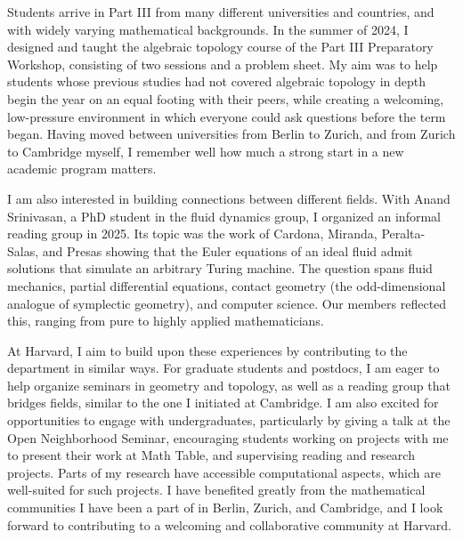 Students arrive in Part III from many different universities and countries, and with widely varying mathematical backgrounds. In the summer of 2024, I designed and taught the algebraic topology course of the Part III Preparatory Workshop, consisting of two sessions and a problem sheet. My aim was to help students whose previous studies had not covered algebraic topology in depth begin the year on an equal footing with their peers, while creating a welcoming, low-pressure environment in which everyone could ask questions before the term began. Having moved between universities from Berlin to Zurich, and from Zurich to Cambridge myself, I remember well how much a strong start in a new academic program matters.

I am also interested in building connections between different fields. With Anand Srinivasan, a PhD student in the fluid dynamics group, I organized an informal reading group in 2025. Its topic was the work of Cardona, Miranda, Peralta-Salas, and Presas showing that the Euler equations of an ideal fluid admit solutions that simulate an arbitrary Turing machine. The question spans fluid mechanics, partial differential equations, contact geometry (the odd-dimensional analogue of symplectic geometry), and computer science. Our members reflected this, ranging from pure to highly applied mathematicians.

At Harvard, I aim to build upon these experiences by contributing to the department in similar ways. For graduate students and postdocs, I am eager to help organize seminars in geometry and topology, as well as a reading group that bridges fields, similar to the one I initiated at Cambridge. I am also excited for opportunities to engage with undergraduates, particularly by giving a talk at the Open Neighborhood Seminar, encouraging students working on projects with me to present their work at Math Table, and supervising reading and research projects. Parts of my research have accessible computational aspects, which are well-suited for such projects.
I have benefited greatly from the mathematical communities I have been a part of in Berlin, Zurich, and Cambridge, and I look forward to contributing to a welcoming and collaborative community at Harvard.
